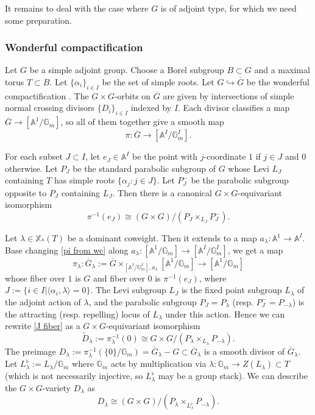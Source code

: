 \documentclass[reqno]{amsart}
\numberwithin{equation}{subsection}
\theoremstyle{definition}
\def\AA{\mathbb{A}}
\def\GG{\mathbb{G}}
\newcommand{\Gm}{\GG_m}
\newcommand\xcoch{\mathbb{X}_*}
\renewcommand{\j}[1]{\langle{#1}\rangle}
\newcommand{\wt}[1]{\widetilde{#1}}
\newcommand{\ov}{\overline}
\newcommand{\incl}{\hookrightarrow}
\renewcommand\a\alpha
\renewcommand{\l}{\lambda}
\newcommand{\co}{\colon}
\begin{document}
It remains to deal with the case where $G$ is of adjoint type, for which we need some preparation. 



\subsubsection{Wonderful compactification} Let $G$ be a simple adjoint group. Choose a Borel subgroup $B\subset G$ and a maximal torus $T\subset B$. Let $\{\a_{i}\}_{i\in I}$ be the set of simple roots. Let $G\incl \ov G$ be the wonderful compactification \cite{DP}. The $G\times G$-orbits on $\ov G$ are given by intersections of simple normal crossing divisors $\{D_{i}\}_{i\in I}$ indexed by $I$. Each divisor classifies a map $\ov G \rightarrow [\AA^1/\Gm]$, so all of them together give a smooth map 
\begin{equation}\label{pi from wc}
\pi: \ov G\to  [\AA^{I}/\Gm^{I}].
\end{equation}

For each subset $J\subset I$, let $e_{J}\in \AA^{I}$ be the point with $j$-coordinate $1$ if $j\in J$ and $0$ otherwise. Let $P_{J}$ be the standard parabolic subgroup of $G$ whose Levi $L_{J}$ containing $T$ has simple roots $\{\a_{j}\co j\in J\}$. Let $P^{-}_{J}$ be the parabolic subgroup opposite to $P_{J}$ containing $L_{J}$. Then there is a canonical $G\times G$-equivariant isomorphism
\begin{equation}\label{J fiber}
\pi^{-1}(e_{J})\cong (G\times G)/(P_{J}\times_{L_{J}}P^{-}_{J}).
\end{equation}


Let $\l\in \xcoch(T)$ be a dominant coweight. Then it extends to a map $a_{\l}: \AA^{1}\to \AA^{I}$. Base changing \eqref{pi from wc} along $a_{\l}: [\AA^{1}/\Gm]\to [\AA^{I}/\Gm^{I}]$, we get a map
\begin{equation}\label{eq:pi_lambda}
\pi_{\l}: \ov G_{\l}:=\ov G\times_{[\AA^{I}/\Gm^{I}], a_{\l}}[\AA^{1}/\Gm]\to [\AA^{1}/\Gm]
\end{equation}
whose fiber over $1$ is $G$ and fiber over $0$ is $\pi^{-1}(e_{J})$, where $J:=\{i\in I|\j{\a_{i},\l}=0\}$. The Levi subgroup $L_{J}$ is the fixed point subgroup $L_{\l}$ of the adjoint action of $\l$, and the parabolic subgroup $P_{J}=P_{\l}$ (resp. $P^{-}_{J}=P_{-\l}$) is the attracting (resp. repelling) locus of $L_{\l}$ under this action. Hence we can rewrite \eqref{J fiber} as a $G\times G$-equivariant isomorphism
\begin{equation*}
\wt D_{\l}:=\pi^{-1}_{\l}(0)\cong G\times G/(P_{\l}\times_{L_{\l}} P_{-\l}).
\end{equation*}
The preimage $D_\lambda := \pi^{-1}_{\l}(\{0\}/\Gm)=\ov G_{\l}-G \subset \ov G_{\l}$ is a smooth divisor of $\ov G_{\l}$. Let $L^{\flat}_{\l}:=L_{\l}/\Gm$ where $\Gm$ acts by multiplication via $\l:\Gm\to Z(L_{\l})\subset T$ (which is not necessarily injective, so $L^{\flat}_{\l}$ may be a group stack). We can describe the $G\times G$-variety  
$D_{\l}$ as 
\begin{equation}\label{eq: D_lambda}
D_{\l}\cong (G\times G)/(P_{\l}\times_{L^{\flat}_{\l}} P_{-\l}).
\end{equation}
\end{document}
